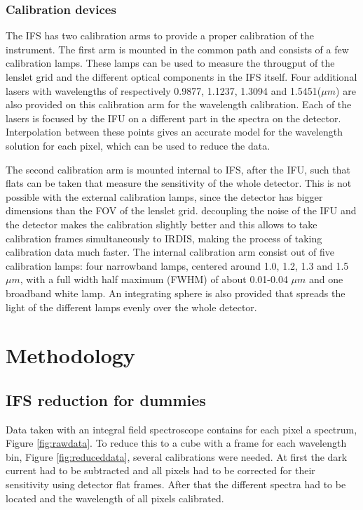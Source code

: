 \documentclass[twoside,single]{lion-msc}
\begin{document}
\subsection{Calibration devices}
The IFS has two calibration arms to provide a proper calibration of the instrument. The first arm is mounted in the common path and consists of a few calibration lamps. These lamps can be used to measure the througput of the lenslet grid and the different optical components in the IFS itself. Four additional lasers with wavelengths of respectively 0.9877, 1.1237, 1.3094 and 1.5451($\mu m$) are also provided on this calibration arm for the wavelength calibration. Each of the lasers is focused by the IFU on a different part in the spectra on the detector. Interpolation between these points gives an accurate model for the wavelength solution for each pixel, which can be used to reduce the data.
\bigskip

The second calibration arm is mounted internal to IFS, after the IFU, such that flats can be taken that measure the sensitivity of the whole detector. This is not possible with the external calibration lamps, since the detector has bigger dimensions than the FOV of the lenslet grid. decoupling the noise of the IFU and the detector makes the calibration slightly better and this allows to take calibration frames simultaneously to IRDIS, making the process of taking calibration data much faster. The internal calibration arm consist out of five calibration lamps: four narrowband lamps, centered around 1.0, 1.2, 1.3 and 1.5 $\mu m$, with a full width half maximum (FWHM) of about 0.01-0.04 $\mu m$ and one broadband white lamp\citep{Desidera}. An integrating sphere is also provided that spreads the light of the different lamps evenly over the whole detector.

\chapter{Methodology}
\section{IFS reduction for dummies}
Data taken with an integral field spectroscope contains for each pixel a spectrum, Figure \ref{fig:rawdata}. To reduce this to a cube with a frame for each wavelength bin, Figure \ref{fig:reduceddata}, several calibrations were needed. At first the dark current had to be subtracted and all pixels had to be corrected for their sensitivity using detector flat frames. After that the different spectra had to be located and the wavelength of all pixels calibrated. 
\end{document}
